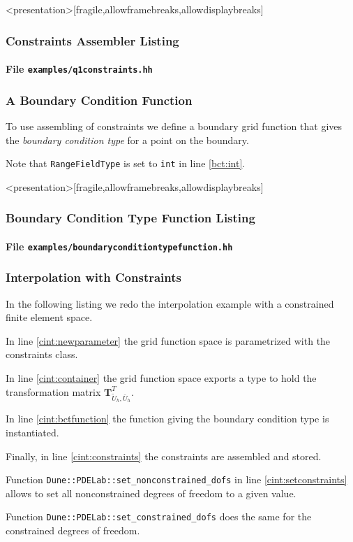 \begin{frame}<presentation>[fragile,allowframebreaks,allowdisplaybreaks]
\frametitle<presentation>{Constraints Assembler Listing}
\framesubtitle<presentation>{File \texttt{examples/q1constraints.hh}}

\end{frame}

\begin{frame}
\frametitle<presentation>{A Boundary Condition Function}
To use assembling of constraints 
we define a boundary grid function that gives the \textit{boundary
condition type} for a point on the boundary.

Note that \lstinline{RangeFieldType} is set to \lstinline{int} in
line \ref{bct:int}.
\end{frame}

\begin{frame}<presentation>[fragile,allowframebreaks,allowdisplaybreaks]
\frametitle<presentation>{Boundary Condition Type Function Listing}
\framesubtitle<presentation>{File \texttt{examples/boundaryconditiontypefunction.hh}}

\end{frame}

\begin{frame}
\frametitle<presentation>{Interpolation with Constraints}
In the following listing we redo the interpolation example 
with a constrained finite element space.

In line \ref{cint:newparameter} the grid function space is
parametrized with the constraints class.

In line \ref{cint:container} the grid function space exports a type to
hold the transformation matrix
$\mathbf{T}^T_{\tilde{U}_h,\bar{U}_h}$. 

In line \ref{cint:bctfunction} the function giving the boundary
condition type is instantiated.

Finally, in line \ref{cint:constraints} the constraints are assembled
and stored.

Function \lstinline{Dune::PDELab::set_nonconstrained_dofs} in
line \ref{cint:setconstraints} allows to set all nonconstrained
degrees of freedom to a given value.

Function \lstinline{Dune::PDELab::set_constrained_dofs} does the same
for the constrained degrees of freedom.
\end{frame}


